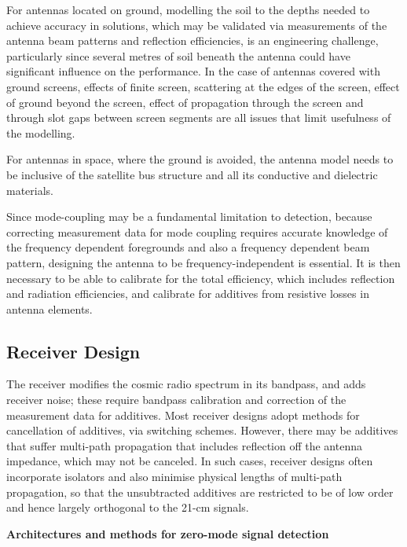 For antennas located on ground, modelling the soil to the depths needed to achieve accuracy in solutions, which may be validated via measurements of the antenna beam patterns and reflection efficiencies, is an engineering challenge, particularly since several metres of soil beneath the antenna could have significant influence on the performance.  In the case of antennas covered with ground screens, effects of finite screen, scattering at the edges of the screen,  effect of ground beyond the screen, effect of propagation through the screen and through slot gaps between screen segments are all issues that limit usefulness of the modelling.

For antennas in space, where the ground is avoided, the antenna model needs to be inclusive of the satellite bus structure and all its conductive and dielectric materials.

Since mode-coupling may be a fundamental limitation to detection, because correcting measurement data for mode coupling requires accurate knowledge of the frequency dependent foregrounds and also a frequency dependent beam pattern, designing the antenna to be frequency-independent is essential.  It is then necessary to be able to calibrate for the total efficiency, which includes reflection and radiation efficiencies, and calibrate for additives from resistive losses in antenna elements.

\subsection{Receiver Design}

The receiver modifies the cosmic radio spectrum in its bandpass, and adds receiver noise; these require bandpass calibration and correction of the measurement data for additives.  Most receiver designs adopt methods for cancellation of additives, via switching schemes.  However, there may be additives that suffer multi-path propagation that includes reflection off the antenna impedance, which may not be canceled.  In such cases, receiver designs often incorporate isolators and also minimise physical lengths of multi-path propagation, so that the unsubtracted additives are restricted to be of low order and hence largely orthogonal to the 21-cm signals.


\textbf{Architectures and methods for zero-mode signal detection}

